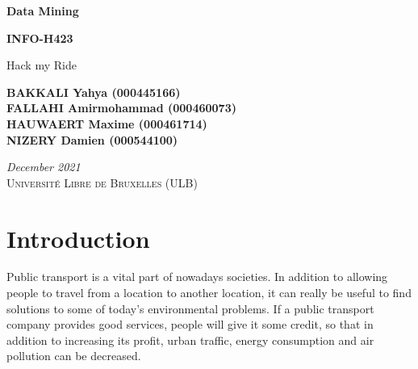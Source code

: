 \documentclass{article}
\begin{document}
\begin{titlepage}
    \begin{center}
        \BgThispage
        \vspace*{1cm}
        
        
        \huge
        \textbf{Data Mining}
        \vspace{0.25cm}
        
        \LARGE
        \textbf{INFO-H423}
        
        \vspace{0.5cm}
        \LARGE
        {Hack my Ride}
        
        
        \vspace{3.5cm}
        
        \textbf{BAKKALI Yahya (000445166) \\}
        \textbf{FALLAHI Amirmohammad (000460073) \\}
        \textbf{HAUWAERT Maxime (000461714) \\}
        \textbf{NIZERY Damien (000544100) \\}
    
        \vspace{2.5cm}
        \textit{December 2021 \\}
        \vspace{0.5cm}
        \textsc{Université Libre de Bruxelles (ULB)}
        
        
    \end{center}
\end{titlepage}

\tableofcontents
\newpage
\setlength{\parskip}{1em}

\section{Introduction}

Public transport is a vital part of nowadays societies. In addition to allowing people to travel from a location to another location, it can really be useful to find solutions to some of today's environmental problems. If a public transport company provides good services, people will give it some credit, so that in addition to increasing its profit, urban traffic, energy consumption and air pollution can be decreased.
\end{document}
